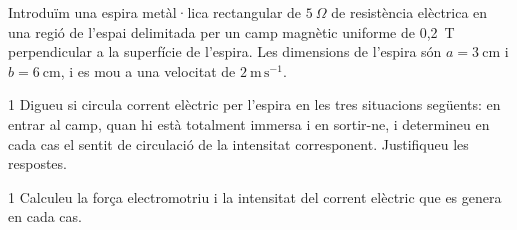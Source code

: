 Introduïm una espira metàl·lica rectangular de $5\ \Omega$ de resistència elèctrica en una regió de l'espai delimitada per un camp magnètic uniforme de 0,2~T perpendicular a la superfície de l'espira. Les dimensions de l'espira són $a = 3\ \mathrm{cm}$ i $b = 6\ \mathrm{cm}$, i es mou a una velocitat de $2\ \mathrm{m\,s^{-1}}$.


\begin{apartat}{1}
Digueu si circula corrent elèctric per l'espira en les tres situacions següents: en entrar al camp, quan hi està totalment immersa i en sortir-ne, i determineu en cada cas el sentit de circulació de la intensitat corresponent. Justifiqueu les respostes.
\end{apartat}

\begin{apartat}{1}
Calculeu la força electromotriu i la intensitat del corrent elèctric que es genera en cada cas.
\end{apartat}
